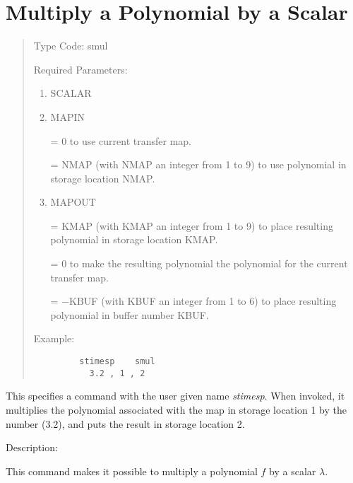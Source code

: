 \newpage
\section{Multiply a Polynomial by a Scalar}  
\begin{quotation}
\noindent     Type Code:  smul
\vspace{5mm}

\noindent Required Parameters:
\begin{enumerate}
      \item  SCALAR

      \item  MAPIN

             = 0 to use current transfer map.

             = NMAP (with NMAP an integer from 1 to 9) to use polynomial in
               storage \hspace*{1em} location NMAP.

      \item  MAPOUT

             = KMAP (with KMAP an integer from 1 to 9) to place resulting
               polynomial \hspace*{1em}in storage location KMAP.

             = 0 to make the resulting polynomial the polynomial  for the current transfer \hspace*{1em}map.

             = $-$KBUF (with KBUF an integer from 1 to 6) to place resulting
               polynomial \hspace*{1em} in buffer number KBUF.

\end{enumerate}

\vspace{5mm}
\noindent Example:
\begin{verbatim}
         stimesp    smul
           3.2 , 1 , 2
\end{verbatim}
\end{quotation}
This specifies a command with the user given name {\em stimesp}.  When invoked, it multiplies the polynomial associated with the map in storage location 1 by the number (3.2), and puts the result in storage location 2.

\vspace{5mm}
     Description:
\vspace{2mm}

This command makes it possible to multiply a polynomial $f$ by a scalar $\lambda$.

